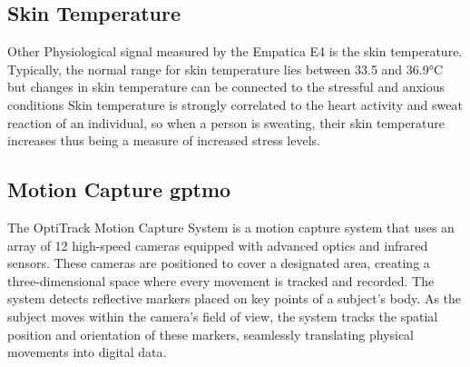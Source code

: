 \subsection*{Skin Temperature }
Other Physiological signal measured by the Empatica E4 is the skin temperature. Typically, the normal range for skin temperature lies between 33.5 and 36.9°C but changes in skin temperature can be connected to the stressful and anxious conditions \parencite{emp2}
Skin temperature is strongly correlated to the heart activity and sweat reaction of an individual, so when a person is sweating, their skin temperature increases thus being a measure of increased stress levels.


\subsection{Motion Capture \gls{gptmo}}
\label{subsec:mocap}
The OptiTrack Motion Capture System is a motion capture system that uses an array of 12 high-speed cameras equipped with advanced optics and infrared sensors. These cameras are positioned to cover a designated area, creating a three-dimensional space where every movement is tracked and recorded. The system detects reflective markers placed on key points of a subject's body. As the subject moves within the camera's field of view, the system tracks the spatial position and orientation of these markers, seamlessly translating physical movements into digital data. 

